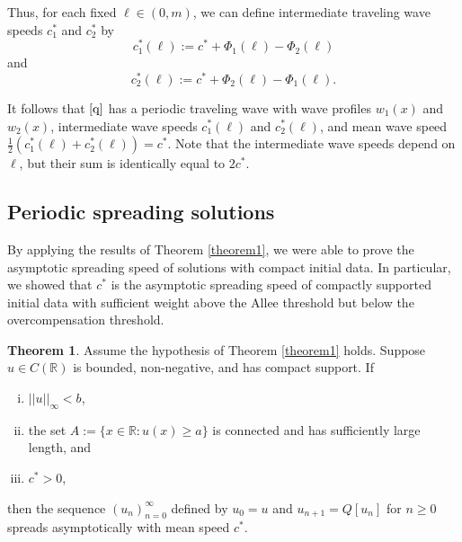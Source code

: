 \documentclass[11pt]{article}
\theoremstyle{definition}
\newtheorem{thm}{Theorem}
\numberwithin{equation}{section}
\numberwithin{thm}{section}
\renewcommand{\a}{a}
\renewcommand{\b}{b}
\newcommand{\m}{m}
\begin{document}
Thus, for each fixed $\ell \in (0,\m)$, we can define intermediate traveling wave speeds $c_1^*$ and $c_2^*$ by
\begin{equation} \label{c1star}
c_1^*(\ell) := c^* + \Phi_1(\ell) - \Phi_2(\ell)
\end{equation}
and
\begin{equation} \label{c2star}
c_2^*(\ell) := c^* + \Phi_2(\ell) - \Phi_1(\ell).
\end{equation}

It follows that $\eqref{q}$ has a periodic traveling wave with wave profiles $w_1(x)$ and $w_2(x)$, intermediate wave speeds $c_1^*(\ell)$ and $c_2^*(\ell)$, and mean wave speed $\frac{1}{2}\left(c_1^*(\ell) + c_2^*(\ell)\right)=c^*$.
Note that the intermediate wave speeds depend on $\ell$, but their sum is identically equal to $2c^*$.

\subsection{Periodic spreading solutions}

By applying the results of Theorem \ref{theorem1}, we were able to prove the asymptotic spreading speed of solutions with compact initial data.
In particular, we showed that $c^*$ is the asymptotic spreading speed of compactly supported initial data with sufficient weight above the Allee threshold but below the overcompensation threshold.

\begin{thm} \label{theorem2}
Assume the hypothesis of Theorem \ref{theorem1} holds. Suppose $u \in C(\mathbb R)$ is bounded, non-negative, and has compact support. If
\begin{enumerate}[i.]
\item $||u|| _\infty < \b$,
\item the set $A := \{ x \in \mathbb R : u(x) \geq \a \} $ is connected and has sufficiently large length, and
\item $c^* > 0$,
\end{enumerate}
then the sequence $(u_n)_{n=0}^{\infty}$ defined by $u_0=u$ and $u_{n+1}=Q[u_n]$ for $n\geq0$ spreads asymptotically with mean speed $c^*$.
\end{thm}
\end{document}
